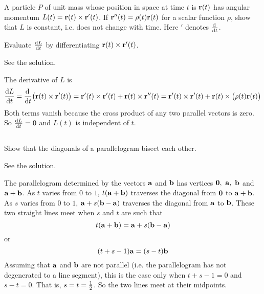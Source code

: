 \begin{question}[M200 2003D] %
 A particle $P$ of unit mass whose position in space at time
$t$ is $\mathbf{r}(t)$ has angular momentum $L(t)=\mathbf{r}(t)\times\mathbf{r}'(t)$.
If $\mathbf{r}''(t)=\rho(t)\mathbf{r}(t)$ for a scalar function $\rho$, show that
$L$ is constant, i.e. does not change with time. Here $'$ denotes 
$\diff{}{t}$.
\end{question}

\begin{hint}
Evaluate $\diff{L}{t}$ by differentiating $\mathbf{r}(t)\times\mathbf{r}'(t)$.
\end{hint}

\begin{answer}
See the solution.
\end{answer}

\begin{solution}
The derivative of $L$ is
\begin{align*}
\diff{L}{t}=\diff{}{t}\big(\vr(t)\times\vr'(t)\big)
=\vr'(t)\times\vr'(t)+\vr(t)\times\vr''(t)
=\vr'(t)\times\vr'(t)+\vr(t)\times\big(\rho(t)\vr(t)\big)
\end{align*}
Both terms vanish because the cross product of any two parallel vectors
is zero. So $\diff{L}{t}=0$ and $L(t)$ is independent of $t$. 
\end{solution}



\subsection*{\Application}

\begin{question}
Show that the diagonals of a parallelogram bisect each other.
\end{question}


\begin{answer}
See the solution.
\end{answer}

\begin{solution}
The parallelogram determined by the vectors $\mathbf{a}$ and $\mathbf{b}$
has vertices $\mathbf{0},\ \mathbf{a},\ \mathbf{b}$ and $\mathbf{a}+\mathbf{b}$.
As $t$ varies from $0$ to $1$, $t(\mathbf{a}+\mathbf{b})$ traverses the
diagonal from $\mathbf{0}$ to $\mathbf{a}+\mathbf{b}$.
As $s$ varies from $0$ to $1$, $\mathbf{a}+s(\mathbf{b}-\mathbf{a})$ traverses the
diagonal from $\mathbf{a}$ to $\mathbf{b}$. These two straight lines meet
when $s$ and $t$ are such that
\begin{equation*}
t(\mathbf{a}+\mathbf{b})=\mathbf{a}+s(\mathbf{b}-\mathbf{a})
\end{equation*}
or
\begin{equation*}
(t+s-1)\mathbf{a}=(s-t)\mathbf{b}
\end{equation*}
Assuming that $\mathbf{a}$ and $\mathbf{b}$ are not parallel (i.e. the parallelogram
has not degenerated to a line segment), this is the case only
when $t+s-1=0$ and $s-t=0$. That is, $s=t=\tfrac{1}{2}$. So the two lines
meet at their midpoints.
\end{solution}


